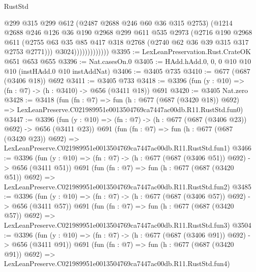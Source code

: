 \begin{lexlean}{RustStd}
\begin{coremodule}
                            @299
                            @315
                            @299
                            @612
                            (@2487 @2688 @246 @60 @36 @315 @2753)
                            (@1214
                              @2688
                              @246
                              @126
                              @36
                              @190
                              @2968
                              @299
                              @611
                              @535
                              @2973
                              (@2716
                                @190
                                @2968
                                @611
                                (@2755
                                  @63
                                  @35
                                  @85
                                  @417
                                  @318
                                  @2768
                                  (@2740 @62 @36 @39 @315 @317 @2753 @2771)))
                              @3024)))))))))))))
@3395 := LexLeanPreservation.Rust.CrateOK @651 @653 @655
@3396 := Nat.casesOn.{0}
@3405 := HAdd.hAdd.{0, 0, 0} @10 @10 @10 (instHAdd.{0} @10 instAddNat)
@3406 := @3405 @735
@3410 := @677 (@687 (@3406 @18)) @692
@3411 := @3405 @733
@3418 := @3396 (fun (y : @10) => (fn : @7) -> (h : @3410) -> @656 (@3411 @18)) @691
@3420 := @3405 Nat.zero
@3428 := @3418
    (fun (fn : @7) =>
    fun (h : @677 (@687 (@3420 @18)) @692) =>
    LexLeanPreserve.C021989951e0013504769ca7447ac00db.R11.RustStd.fun0)
@3447 := @3396
    (fun (y : @10) => (fn : @7) -> (h : @677 (@687 (@3406 @23)) @692) -> @656 (@3411 @23))
    @691
    (fun (fn : @7) =>
    fun (h : @677 (@687 (@3420 @23)) @692) =>
    LexLeanPreserve.C021989951e0013504769ca7447ac00db.R11.RustStd.fun1)
@3466 := @3396
    (fun (y : @10) => (fn : @7) -> (h : @677 (@687 (@3406 @51)) @692) -> @656 (@3411 @51))
    @691
    (fun (fn : @7) =>
    fun (h : @677 (@687 (@3420 @51)) @692) =>
    LexLeanPreserve.C021989951e0013504769ca7447ac00db.R11.RustStd.fun2)
@3485 := @3396
    (fun (y : @10) => (fn : @7) -> (h : @677 (@687 (@3406 @57)) @692) -> @656 (@3411 @57))
    @691
    (fun (fn : @7) =>
    fun (h : @677 (@687 (@3420 @57)) @692) =>
    LexLeanPreserve.C021989951e0013504769ca7447ac00db.R11.RustStd.fun3)
@3504 := @3396
    (fun (y : @10) => (fn : @7) -> (h : @677 (@687 (@3406 @91)) @692) -> @656 (@3411 @91))
    @691
    (fun (fn : @7) =>
    fun (h : @677 (@687 (@3420 @91)) @692) =>
    LexLeanPreserve.C021989951e0013504769ca7447ac00db.R11.RustStd.fun4)

\end{coremodule}
\end{lexlean}
